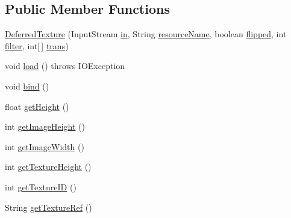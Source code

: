 \subsection*{Public Member Functions}
\begin{DoxyCompactItemize}
\item 
\mbox{\hyperlink{classorg_1_1newdawn_1_1slick_1_1opengl_1_1_deferred_texture_a16b08f709a4f279205b40e5bcf9902f1}{Deferred\+Texture}} (Input\+Stream \mbox{\hyperlink{classorg_1_1newdawn_1_1slick_1_1opengl_1_1_deferred_texture_a489ed93637c4777d8f36d17233a77d59}{in}}, String \mbox{\hyperlink{classorg_1_1newdawn_1_1slick_1_1opengl_1_1_deferred_texture_a883fc20f133626f8f49684adb5b65976}{resource\+Name}}, boolean \mbox{\hyperlink{classorg_1_1newdawn_1_1slick_1_1opengl_1_1_deferred_texture_a1dcb7e5cee99769047c984f3fe8f7a8f}{flipped}}, int \mbox{\hyperlink{classorg_1_1newdawn_1_1slick_1_1opengl_1_1_deferred_texture_abb572d47ae7bce7204cc9c86245c9797}{filter}}, int\mbox{[}$\,$\mbox{]} \mbox{\hyperlink{classorg_1_1newdawn_1_1slick_1_1opengl_1_1_deferred_texture_a8dc1083c72d7039e412c71e1cd75d4e6}{trans}})
\item 
void \mbox{\hyperlink{classorg_1_1newdawn_1_1slick_1_1opengl_1_1_deferred_texture_adaa55791770295ee94c057781634b50a}{load}} ()  throws I\+O\+Exception 
\item 
void \mbox{\hyperlink{classorg_1_1newdawn_1_1slick_1_1opengl_1_1_deferred_texture_a5cd19d9ae09f098e85030b777e6de069}{bind}} ()
\item 
float \mbox{\hyperlink{classorg_1_1newdawn_1_1slick_1_1opengl_1_1_deferred_texture_ab934e107804aa927cc4bdc90212f7e1f}{get\+Height}} ()
\item 
int \mbox{\hyperlink{classorg_1_1newdawn_1_1slick_1_1opengl_1_1_deferred_texture_a65cba14cf7d1cd94354f6031dd609634}{get\+Image\+Height}} ()
\item 
int \mbox{\hyperlink{classorg_1_1newdawn_1_1slick_1_1opengl_1_1_deferred_texture_a12271dcbc3878ff74af0aae565356904}{get\+Image\+Width}} ()
\item 
int \mbox{\hyperlink{classorg_1_1newdawn_1_1slick_1_1opengl_1_1_deferred_texture_a71d22424b36651006e822d715c97ea73}{get\+Texture\+Height}} ()
\item 
int \mbox{\hyperlink{classorg_1_1newdawn_1_1slick_1_1opengl_1_1_deferred_texture_a20ec239f08d67ed95ed1091d402dbf9f}{get\+Texture\+ID}} ()
\item 
String \mbox{\hyperlink{classorg_1_1newdawn_1_1slick_1_1opengl_1_1_deferred_texture_a063653545f11f5af27c1fdbcc25cf540}{get\+Texture\+Ref}} ()

\end{DoxyCompactItemize}
